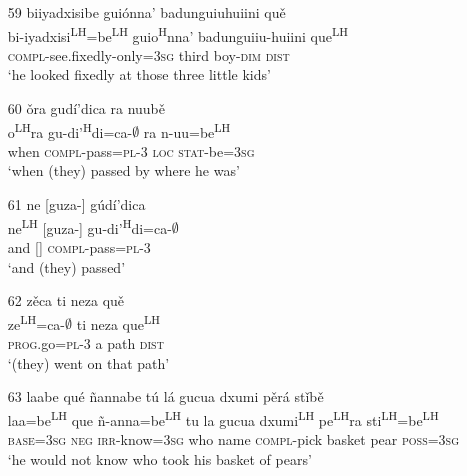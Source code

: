 \begin{itemize}
\item[59]
\glll biiyadxisibe gui\'{o}nna' badunguiuhuiini qu\v{e}\\
bi-iyadxisi\textsuperscript{LH}=be\textsuperscript{LH} guio\textsuperscript{H}nna' badunguiiu-huiini que\textsuperscript{LH}\\
\textsc{compl}-see.fixedly-only=\textsc{3sg} third boy-\textsc{dim} \textsc{dist}\\
\glt `he looked fixedly at those three little kids'


\item[60]
\glll \v{o}ra gud\'{i}'dica ra nuub\v{e}\\
o\textsuperscript{LH}ra gu-di'\textsuperscript{H}di=ca-$\emptyset$ ra n-uu=be\textsuperscript{LH}\\
when \textsc{compl}-pass=\textsc{pl}-\textsc{3} \textsc{loc} \textsc{stat}-be=\textsc{3sg}\\
\glt `when (they) passed by where he was'


\item[61]
\glll ne [guza-] g\'{u}d\'{i}'dica\\
ne\textsuperscript{LH} [guza-] gu-di'\textsuperscript{H}di=ca-$\emptyset$\\
and [] \textsc{compl}-pass=\textsc{pl}-\textsc{3}\\
\glt `and (they) passed'
 

\item[62]
\glll z\v{e}ca ti neza qu\v{e}\\
ze\textsuperscript{LH}=ca-$\emptyset$ ti neza que\textsuperscript{LH}\\
\textsc{prog}.go=\textsc{pl}-\textsc{3} a path \textsc{dist}\\
\glt `(they) went on that path'
 

\item[63]
\glll laabe qu\'{e} \~{n}annabe t\'{u} l\'{a} gucua dxumi p\v{e}r\'{a} st\v{i}b\v{e}\\
laa=be\textsuperscript{LH} que \~{n}-anna=be\textsuperscript{LH} tu la gucua dxumi\textsuperscript{LH} pe\textsuperscript{LH}ra sti\textsuperscript{LH}=be\textsuperscript{LH}\\
\textsc{base}=\textsc{3sg} \textsc{neg} \textsc{irr}-know=\textsc{3sg} who name \textsc{compl}-pick basket pear \textsc{poss}=\textsc{3sg}\\
\glt `he would not know who took his basket of pears'

\end{itemize}

